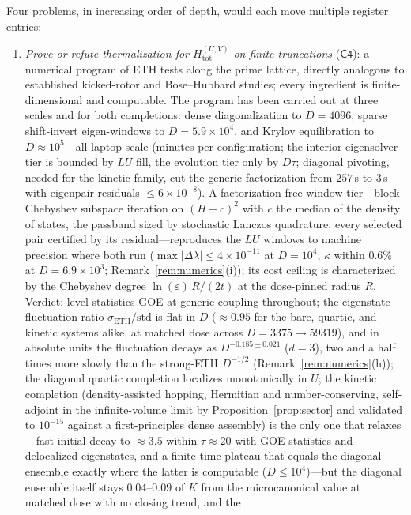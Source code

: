 \documentclass[11pt,a4paper]{article}
\theoremstyle{plain}
\theoremstyle{definition}
\theoremstyle{remark}
\begin{document}
Four problems, in increasing order of depth, would each move multiple register entries:
\begin{enumerate}[leftmargin=1.6em]
\item \emph{Prove or refute thermalization for $H_{\mathrm{tot}}^{(U,V)}$ on finite
truncations} ($\mathsf{C4}$): a numerical program of ETH tests along the prime
lattice, directly analogous to established kicked-rotor and Bose--Hubbard studies;
every ingredient is finite-dimensional and computable. The program has been carried out
at three scales and for both completions: dense diagonalization to $D=4096$, sparse
shift-invert eigen-windows to $D=5.9\times10^{4}$, and Krylov equilibration to
$D\approx10^{5}$---all laptop-scale (minutes per configuration; the interior
eigensolver tier is bounded by $LU$ fill, the evolution tier only by $D\tau$; diagonal
pivoting, needed for the kinetic family, cut the generic factorization from $257$\,s
to $3$\,s with eigenpair residuals $\leq6\times10^{-8}$). A factorization-free
window tier---block Chebyshev subspace iteration on $(H-c)^{2}$ with $c$ the median of
the density of states, the passband sized by stochastic Lanczos quadrature, every
selected pair certified by its residual---reproduces the $LU$ windows to machine
precision where both run ($\max|\Delta\lambda|\leq4\times10^{-11}$ at $D=10^{4}$,
$\kappa$ within $0.6\%$ at $D=6.9\times10^{3}$; Remark~\ref{rem:numerics}(i)); its
cost ceiling is characterized by the Chebyshev degree $\ln(\varepsilon)\,R/(2t)$ at the
dose-pinned radius $R$. Verdict: level
statistics GOE at generic coupling throughout; the eigenstate fluctuation ratio
$\sigma_{\mathrm{ETH}}/\mathrm{std}$ is flat in $D$ ($\approx0.95$ for the bare, quartic, and
kinetic systems alike, at matched dose across $D=3375\to59319$), and in absolute units the
fluctuation decays as $D^{-0.185\pm0.021}$ ($d=3$), two and a half times more slowly than
the strong-ETH $D^{-1/2}$ (Remark~\ref{rem:numerics}(h)); the diagonal quartic
completion localizes monotonically in
$U$; the kinetic completion (density-assisted hopping, Hermitian and number-conserving,
self-adjoint in the infinite-volume limit by Proposition~\ref{prop:sector} and validated
to $10^{-15}$ against a first-principles dense assembly) is the only one that
relaxes---fast initial decay to
$\approx3.5$ within $\tau\approx20$ with GOE statistics and delocalized eigenstates,
and a finite-time plateau that equals the diagonal ensemble exactly where the latter is
computable ($D\leq10^{4}$)---but the diagonal ensemble itself stays $0.04$--$0.09$ of
$K$ from the microcanonical value at matched dose with no closing trend, and the

\end{enumerate}
\end{document}
